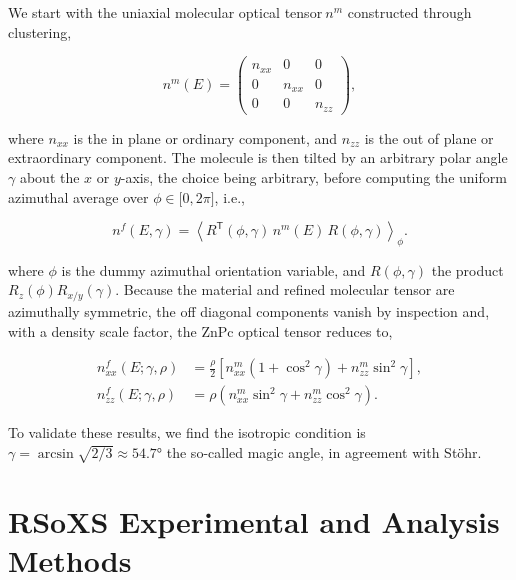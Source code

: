 We start with the uniaxial molecular optical tensor\({\ n}^{m}\) constructed through clustering,

\begin{equation}
  n^{m}(E) = \begin{pmatrix} n_{xx} & 0 & 0 \\ 0 & n_{xx} & 0 \\ 0 & 0 & n_{zz} \end{pmatrix},
  \label{eq:S-molecular-tensor}
\end{equation}

where \(n_{xx}\) is the in plane or ordinary component, and \(n_{zz}\) is the out of plane or extraordinary component. The molecule is then tilted by an arbitrary polar angle \(\gamma\) about the \(x\) or \(y\)-axis, the choice being arbitrary, before computing the uniform azimuthal average over \(\phi \in \lbrack 0,2\pi\rbrack\), i.e.,

\begin{equation}
  n^{f}(E,\gamma) = \left\langle R^{\mathsf{T}}(\phi,\gamma)\, n^{m}(E)\, R(\phi,\gamma) \right\rangle_{\phi}.
  \label{eq:S-film-average}
\end{equation}

where \(\phi\) is the dummy azimuthal orientation variable, and \(R(\phi,\gamma)\) the product \(R_{z}(\phi)R_{x/y}(\gamma)\). Because the material and refined molecular tensor are azimuthally symmetric, the off diagonal components vanish by inspection and, with a density scale factor, the ZnPc optical tensor reduces to,

\begin{align}
  n_{xx}^{f}(E;\gamma,\rho) &= \frac{\rho}{2}\left[ n_{xx}^{m}\left( 1 + \cos^{2}\gamma \right) + n_{zz}^{m}\sin^{2}\gamma \right], \label{eq:S-film-xx}\\
  n_{zz}^{f}(E;\gamma,\rho) &= \rho\left( n_{xx}^{m}\sin^{2}\gamma + n_{zz}^{m}\cos^{2}\gamma \right). \label{eq:S-film-zz}
\end{align}

To validate these results, we find the isotropic condition is \(\gamma = \arcsin\sqrt{2/3} \approx \ang{54.7}\) the so-called magic angle, in agreement with Stöhr.\autocite{stohrNEXAFSSpectroscopy1992}

\section{RSoXS Experimental and Analysis Methods}\label{sec:rsoxs-experimental-and-analysis-methods}

